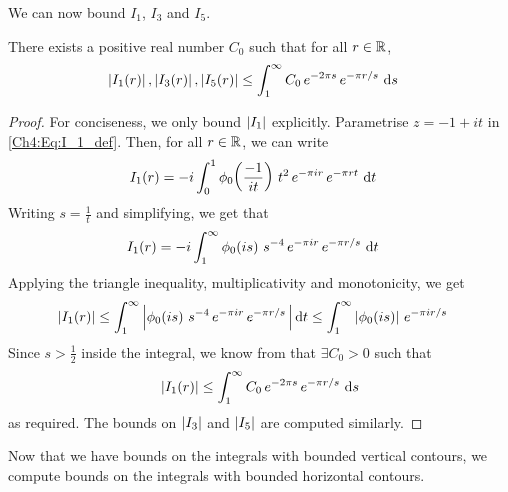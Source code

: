 We can now bound $I_1$, $I_3$ and $I_5$.

\begin{boxlemma}\label{Ch4:Lemma:Bound_I1_I3_I5}
    There exists a positive real number $C_0$ such that for all $r \in \mathbb{R}$,
    \begin{align*}
        \left\lvert I_1(r) \right\rvert, \left\lvert I_3(r) \right\rvert, \left\lvert I_5(r) \right\rvert &\leq \int_{1}^{\infty} C_0 \, e^{-2\pi s} \, e^{-\pi r/s} \, \operatorname{d}\!{s}
    \end{align*}
\end{boxlemma}
\begin{proof}
    For conciseness, we only bound $\left\lvert I_1 \right\rvert$ explicitly. Parametrise $z = -1 + it$ in \eqref{Ch4:Eq:I_1_def}. Then, for all $r \in \mathbb{R}$, we can write
    \begin{align*}
        I_1(r) &= -i \int_{0}^{1}
            \phi_0\!\left( \frac{-1}{it} \right) \,
            t^2 \,
            e^{-\pi i r} \,
            e^{-\pi r t}\,
            \operatorname{d}\!{t}
    \end{align*}
    Writing $s = \frac{1}{t}$ and simplifying, we get that
    \begin{align*}
        I_1(r) &= -i \int_{1}^{\infty}
            \phi_0\!\left( is \right) \,
            s^{-4} \,
            e^{-\pi i r} \,
            e^{-\pi r / s}\,
            \operatorname{d}\!{t}
    \end{align*}
    Applying the triangle inequality, multiplicativity and monotonicity, we get
    \begin{align*}
        \left\lvert I_1(r) \right\rvert &\leq \int_{1}^{\infty} \left\lvert 
            \phi_0\!\left( is \right) \,
            s^{-4} \,
            e^{-\pi i r} \,
            e^{-\pi r / s}\,
             \right\rvert \operatorname{d}\!{t}
        \leq \int_{1}^{\infty}
            \left\lvert \phi_0\!\left( is \right) \right\rvert \,
            e^{-\pi i r/s}
    \end{align*}
    Since $s > \frac{1}{2}$ inside the integral, we know from  that $\exists C_0 > 0$ such that
    \begin{align*}
        \left\lvert I_1(r) \right\rvert \leq \int_{1}^{\infty} C_0 \, e^{-2\pi s} \, e^{-\pi r/s} \, \operatorname{d}\!{s}
    \end{align*}
    as required. The bounds on $\left\lvert I_3 \right\rvert$ and $\left\lvert I_5 \right\rvert$ are computed similarly.
\end{proof}

Now that we have bounds on the integrals with bounded vertical contours, we compute bounds on the integrals with bounded horizontal contours.

